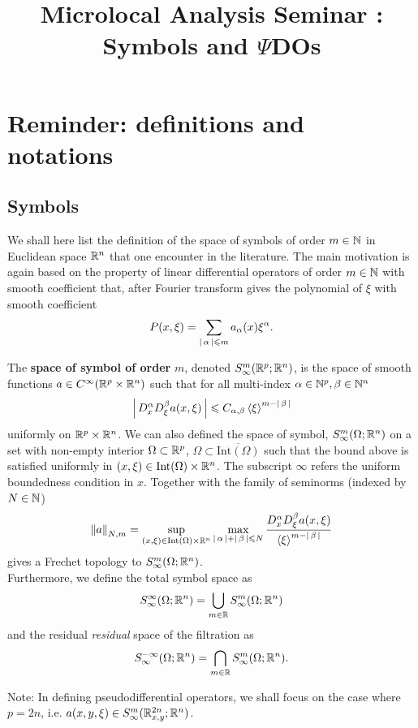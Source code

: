 \documentclass{article}
\title{Microlocal Analysis Seminar : Symbols and $\Psi$DOs}
\begin{document}
\maketitle
\tableofcontents
\section{Reminder: definitions and notations}
\subsection{Symbols} 
We shall here list the definition of the space of symbols of order $m \in \N$  in Euclidean space $\R^n$ that one encounter in the literature. The main motivation is again based on the property of linear differential operators of order $m \in \N$ with smooth coefficient that, after Fourier transform gives the polynomial of $\xi$ with smooth coefficient 
\begin{align*}
P(x, \xi) = \sum_{\abs{\alpha} \leq m} a_\alpha(x) \xi^\alpha. 
\end{align*}


\begin{fdefinition}
    The \textbf{space of symbol of order} $m$, denoted $S^m_\infty(\R^p; \R^n)$, is the space of smooth functions $a \in C^\infty(\R^p \times \R^n)$ such that for all multi-index $\alpha \in \N^p, \beta \in \N^n$
    \begin{align*}
    \abs{D^\alpha_x D^\beta_\xi a (x, \xi)} \leq C_{\alpha, \beta} \sym[\xi]^{m - \abs{\beta}} 
    \end{align*}
    uniformly on $\R^p \times \R^n$. We can also defined the space of symbol, $S^m_\infty(\Omega; \R^n)$ on a set with non-empty interior $\Omega \subset \R^p$, $\Omega \subset \overline{\mathrm{Int}(\Omega)}$ such that the bound above is satisfied uniformly in $(x, \xi) \in \mathrm{Int}(\Omega) \times \R^n$. The subscript $\infty$ refers the uniform boundedness condition in $x$. Together with the family of seminorms (indexed by $N \in \N$) 
    \begin{align} \label{eq : symbol seminorms} 
    \norm[a]_{N, m} = \sup_{(x, \xi) \in \mathrm{Int}(\Omega) \times \R^n} \max_{\abs{\alpha} + \abs{\beta} \leq N} \frac{D^\alpha_x D^\beta_\xi a(x, \xi)}{\sym[\xi]^{m - \abs{\beta}}} 
    \end{align}
    gives a Frechet topology to $S^m_\infty(\Omega; \R^n)$. \\
    
    Furthermore, we define the total symbol space as
    \[
    S^\infty_\infty(\Omega; \R^n) = \bigcup_{m \in \R} S^{m}_\infty(\Omega; \R^n)
    \]
    and the residual \emph{residual} space of the filtration as 
    \[
    S^{-\infty}_\infty(\Omega; \R^n) = \bigcap_{m \in \R} S^{m}_\infty(\Omega; \R^n). 
    \]
    
    Note: In defining pseudodifferential operators, we shall focus on the case where $p = 2n$, i.e. $a(x, y, \xi) \in S^{m}_\infty(\R^{2n}_{x,y}; \R^n)$. 
\end{fdefinition}
\end{document}
